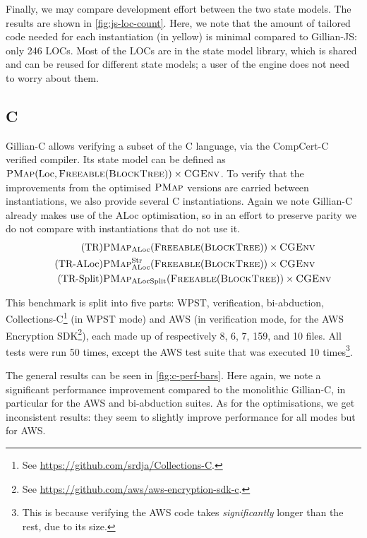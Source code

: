 Finally, we may compare development effort between the two state models. The results are shown in \autoref{fig:js-loc-count}. Here, we note that the amount of tailored code needed for each instantiation (in yellow) is minimal compared to Gillian-JS: only 246 LOCs. Most of the LOCs are in the state model library, which is shared and can be reused for different state models; a user of the engine does not need to worry about them.

\subsection{C}

Gillian-C allows verifying a subset of the C language, via the CompCert-C verified compiler. Its state model can be defined as ${\textsc{PMap}(\text{Loc},\textsc{Freeable}(\textsc{BlockTree})) \times \textsc{CGEnv}}$. To verify that the improvements from the optimised $\textsc{PMap}$ versions are carried between instantiations, we also provide several C instantiations. Again we note Gillian-C already makes use of the ALoc optimisation, so in an effort to preserve parity we do not compare with instantiations that do not use it.
\begin{align}
\tag{TR}       & \textsc{PMap}_{\text{ALoc}}(\textsc{Freeable}(\textsc{BlockTree})) \times \textsc{CGEnv} \\
\tag{TR-ALoc}  & \textsc{PMap}_{\text{ALoc}}^{\text{Str}}(\textsc{Freeable}(\textsc{BlockTree})) \times \textsc{CGEnv} \\
\tag{TR-Split} & \textsc{PMap}_{\text{ALocSplit}}(\textsc{Freeable}(\textsc{BlockTree})) \times \textsc{CGEnv}
\end{align}

This benchmark is split into five parts: WPST, verification, bi-abduction, \mbox{Collections-C}\footnote{See \url{https://github.com/srdja/Collections-C}.} (in WPST mode) and AWS (in verification mode, for the AWS Encryption SDK\footnote{See \url{https://github.com/aws/aws-encryption-sdk-c}.}), each made up of respectively 8, 6, 7, 159, and 10 files. All tests were run 50 times, except the AWS test suite that was executed 10 times\footnote{This is because verifying the AWS code takes \emph{significantly} longer than the rest, due to its size.}.

The general results can be seen in \autoref{fig:c-perf-bars}. Here again, we note a significant performance improvement compared to the monolithic Gillian-C, in particular for the AWS and bi-abduction suites. As for the optimisations, we get inconsistent results: they seem to slightly improve performance for all modes but for AWS.

